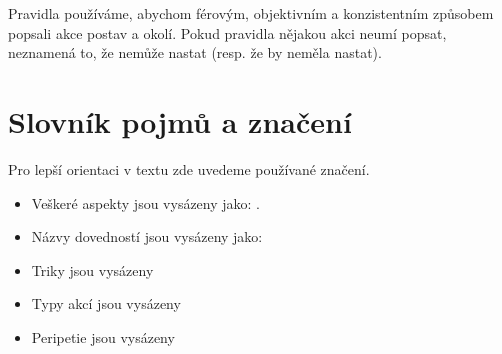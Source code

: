 \documentclass[../main.tex]{subfiles}
\begin{document}
Pravidla používáme, abychom férovým, objektivním a konzistentním způsobem popsali akce postav a okolí. Pokud pravidla nějakou akci neumí popsat, neznamená to, že nemůže nastat (resp. že by neměla nastat).

\section{Slovník pojmů a značení}
\label{sec:slovnik}
Pro lepší orientaci v textu zde uvedeme používané značení.

\begin{itemize}
\item Veškeré aspekty jsou vysázeny jako: .
\item Názvy dovedností jsou vysázeny jako: 
\item Triky jsou vysázeny 
\item Typy akcí jsou vysázeny 
\item Peripetie jsou vysázeny 
\end{itemize}
\end{document}
